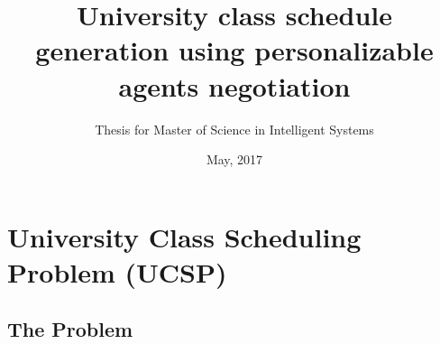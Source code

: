 \documentclass{beamer}
\title{University class schedule generation using personalizable agents negotiation}
\subtitle{Thesis for Master of Science in Intelligent Systems}
\institute[ITESM]{Tecnol\'{o}gico de Monterrey}
\date{May, 2017}
\begin{document}
\frame{\titlepage}
\frame{\tableofcontents} %

\section{University Class Scheduling Problem (UCSP)}
\subsection{The Problem}

\end{document}
